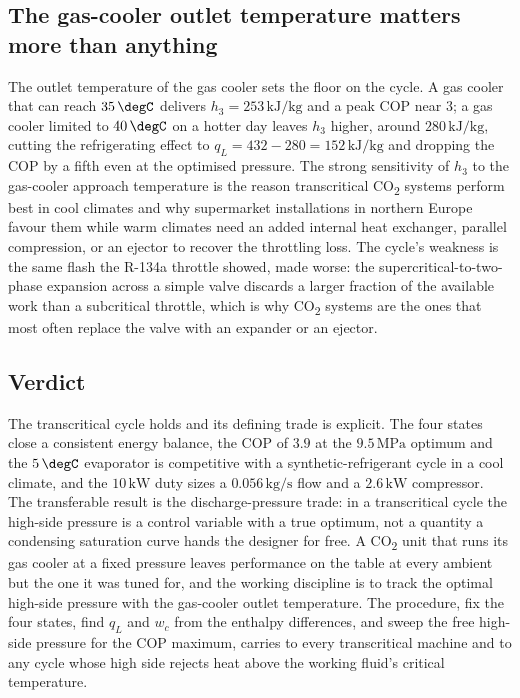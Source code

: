 

\subsection{The gas-cooler outlet temperature matters more than anything}

The outlet temperature of the gas cooler sets the floor on the cycle. A
gas cooler that can reach $35\,\degC$ delivers $h_3 = 253\,\text{kJ}/
\text{kg}$ and a peak COP near $3$; a gas cooler limited to $40\,\degC$ on a
hotter day leaves $h_3$ higher, around $280\,\text{kJ}/\text{kg}$, cutting
the refrigerating effect to $q_L = 432 - 280 = 152\,\text{kJ}/\text{kg}$ and
dropping the COP by a fifth even at the optimised pressure. The strong
sensitivity of $h_3$ to the gas-cooler approach temperature is the reason
transcritical CO\textsubscript{2} systems perform best in cool climates and
why supermarket installations in northern Europe favour them while warm
climates need an added internal heat exchanger, parallel compression, or an
ejector to recover the throttling loss. The cycle's weakness is the same
flash the R-134a throttle showed, made worse: the supercritical-to-two-phase
expansion across a simple valve discards a larger fraction of the available
work than a subcritical throttle, which is why CO\textsubscript{2} systems
are the ones that most often replace the valve with an expander or an
ejector.

\subsection{Verdict}

The transcritical cycle holds and its defining trade is explicit. The four
states close a consistent energy balance, the COP of $3.9$ at the
$9.5\,\text{MPa}$ optimum and the $5\,\degC$ evaporator is competitive with
a synthetic-refrigerant cycle in a cool climate, and the $10\,\text{kW}$
duty sizes a $0.056\,\text{kg}/\text{s}$ flow and a $2.6\,\text{kW}$
compressor. The transferable result is the discharge-pressure trade: in a
transcritical cycle the high-side pressure is a control variable with a true
optimum, not a quantity a condensing saturation curve hands the designer for
free. A CO\textsubscript{2} unit that runs its gas cooler at a fixed
pressure leaves performance on the table at every ambient but the one it was
tuned for, and the working discipline is to track the optimal high-side
pressure with the gas-cooler outlet temperature. The procedure, fix the four
states, find $q_L$ and $w_c$ from the enthalpy differences, and sweep the
free high-side pressure for the COP maximum, carries to every transcritical
machine and to any cycle whose high side rejects heat above the working
fluid's critical temperature.

